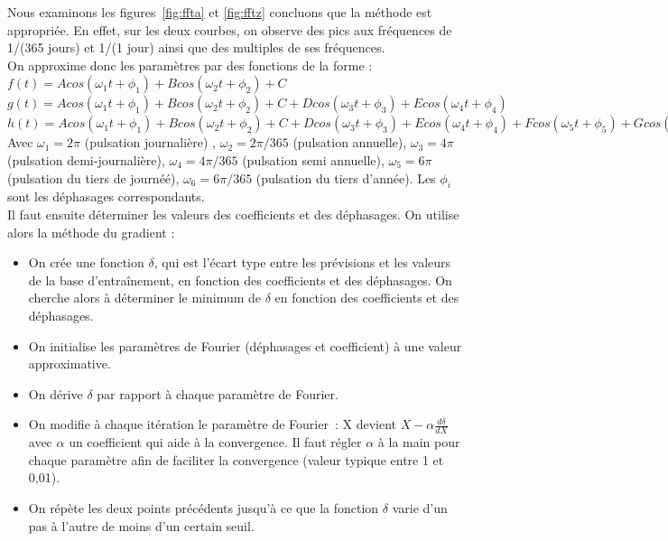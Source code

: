 \documentclass[11pt,a4paper]{article}
\begin{document}
Nous examinons les figures~\ref{fig:ffta} et \ref{fig:fftz} concluons que la méthode est appropriée. En effet, sur les deux courbes, on observe des pics aux fréquences de 1/(365 jours) et 1/(1 jour) ainsi que des multiples de ses fréquences. \\
On approxime donc les paramètres par des fonctions de la forme : \\
 $f(t) = A cos (\omega_{1} t + \phi_{1}) + B cos (\omega_{2} t + \phi_{2}) + C$  \\
$g(t) = A cos (\omega_{1} t + \phi_{1}) + B cos (\omega_{2} t + \phi_{2}) + C + D cos (\omega_{3} t + \phi_{3}) + E cos (\omega_{4} t + \phi_{4})$ \\
$h(t) = A cos (\omega_{1} t + \phi_{1}) + B cos (\omega_{2} t + \phi_{2}) + C + D cos (\omega_{3} t + \phi_{3}) + E cos (\omega_{4} t + \phi_{4}) + F cos (\omega_{5} t + \phi_{5}) + G cos (\omega_{6} t + \phi_{6})$ \\ 
Avec $\omega_{1} = 2 \pi$ (pulsation journalière) , $\omega_{2} = 2 \pi /365$ (pulsation annuelle), $\omega_{3} = 4 \pi$ (pulsation demi-journalière), $\omega_{4} = 4\pi/365 $  (pulsation semi annuelle), $\omega_{5} = 6 \pi$ (pulsation du tiers de journéé), $\omega_{6} = 6\pi/365 $  (pulsation du tiers d'année). Les $\phi_i$ sont les déphasages correspondants. \\

Il faut ensuite déterminer les valeurs des coefficients et des déphasages. On utilise alors la méthode du gradient :
\begin{itemize}
\item On crée une fonction $\delta$, qui est l'écart type entre les prévisions et les valeurs de la base d'entraînement, en fonction des coefficients et des déphasages. On cherche alors à déterminer le minimum de $\delta$ en fonction des coefficients et des déphasages.
\item On initialise les paramètres de Fourier (déphasages et coefficient) à une valeur approximative.
\item On dérive $\delta$ par rapport à chaque paramètre de Fourier.
\item On modifie à chaque itération le paramètre de Fourier~: X devient $ X - \alpha  \frac{d \delta}{dX} $ avec $\alpha$ un coefficient qui aide à la convergence. Il faut régler $\alpha$ à la main pour chaque paramètre afin de faciliter la convergence (valeur typique entre 1 et 0,01).
\item On répète les deux points précédents jusqu'à ce que la fonction $\delta$ varie d'un pas à l'autre de moins d'un certain seuil.
\end{itemize}
\end{document}
